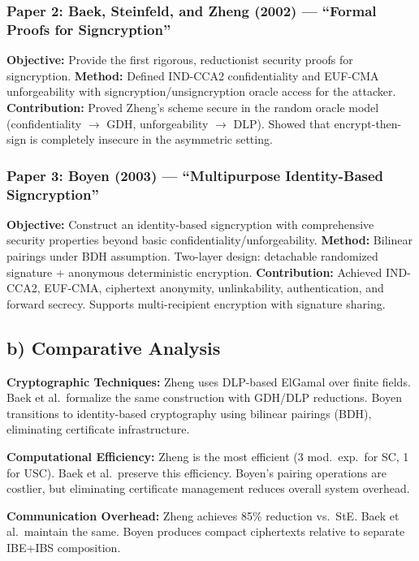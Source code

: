 \documentclass[11pt,a4paper]{article}
\begin{document}
\subsubsection{Paper 2: Baek, Steinfeld, and Zheng (2002) --- ``Formal Proofs for Signcryption''~\cite{baek2002}}

\textbf{Objective:} Provide the first rigorous, reductionist security proofs for signcryption.
\textbf{Method:} Defined IND-CCA2 confidentiality and EUF-CMA unforgeability with signcryption/unsigncryption oracle access for the attacker.
\textbf{Contribution:} Proved Zheng's scheme secure in the random oracle model (confidentiality $\to$ GDH, unforgeability $\to$ DLP). Showed that encrypt-then-sign is completely insecure in the asymmetric setting.

\subsubsection{Paper 3: Boyen (2003) --- ``Multipurpose Identity-Based Signcryption''~\cite{boyen2003}}

\textbf{Objective:} Construct an identity-based signcryption with comprehensive security properties beyond basic confidentiality/unforgeability.
\textbf{Method:} Bilinear pairings under BDH assumption. Two-layer design: detachable randomized signature + anonymous deterministic encryption.
\textbf{Contribution:} Achieved IND-CCA2, EUF-CMA, ciphertext anonymity, unlinkability, authentication, and forward secrecy. Supports multi-recipient encryption with signature sharing.

\subsection{b) Comparative Analysis}

\textbf{Cryptographic Techniques:} Zheng uses DLP-based ElGamal over finite fields. Baek et al.\ formalize the same construction with GDH/DLP reductions. Boyen transitions to identity-based cryptography using bilinear pairings (BDH), eliminating certificate infrastructure.

\textbf{Computational Efficiency:} Zheng is the most efficient (3 mod.\ exp.\ for SC, 1 for USC). Baek et al.\ preserve this efficiency. Boyen's pairing operations are costlier, but eliminating certificate management reduces overall system overhead.

\textbf{Communication Overhead:} Zheng achieves 85\% reduction vs.\ StE. Baek et al.\ maintain the same. Boyen produces compact ciphertexts relative to separate IBE+IBS composition.
\end{document}
